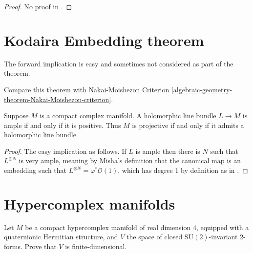 \begin{proof}
No proof in \cite{sea}.
\end{proof}

\section{Kodaira Embedding theorem}
\label{section-Kodaira-Embedding-theorem}

The forward implication is easy and sometimes not considered as part of the
theorem.

Compare this theorem with Nakai-Moishezon Criterion
\ref{algebraic-geometry-theorem-Nakai-Moishezon-criterion}.

\begin{theorem}
\label{theorem-Kodaira-embedding}
\begin{reference}
\cite[Theorem 10.12]{lec}
\end{reference}
Suppose $M$ is a compact complex manifold. A holomorphic line bundle $L\to M$ is
ample if and only if it is positive. Thus $M$ is projective if and only if it
admits a holomorphic line bundle.
\end{theorem}

\begin{proof}
The easy implication as follows. If $L$ is ample then there is $N$ such that
$L^{\otimes N}$ is very ample, meaning by Misha's definition that the canonical
map is an embedding such that $L^{\otimes N}=\varphi^*\mathcal{O}(1)$, which has
degree 1 by definition as in \cite[15.4.14]{sea}.
\end{proof}

\section{Hypercomplex manifolds}
\label{section-hypercomplex-manifolds}

\begin{exercise}
\label{exercise-SU2-invariant-forms}
Let $M$ be a compact hypercomplex manifold of real dimension 4, equipped with a
quaternionic Hermitian structure, and $V$ the space of closed
$\text{SU}(2)$-invariant 2-forms. Prove that $V$ is finite-dimensional.
\end{exercise}

